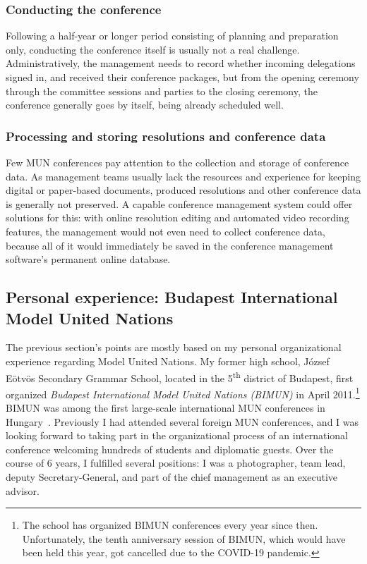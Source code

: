 \subsubsection{Conducting the conference}

Following a half-year or longer period consisting of planning and preparation only, conducting the conference itself is usually not a real challenge. Administratively, the management needs to record whether incoming delegations signed in, and received their conference packages, but from the opening ceremony through the committee sessions and parties to the closing ceremony, the conference generally goes by itself, being already scheduled well.

\subsubsection{Processing and storing resolutions and conference data}

Few MUN conferences pay attention to the collection and storage of conference data. As management teams usually lack the resources and experience for keeping digital or paper-based documents, produced resolutions and other conference data is generally not preserved. A capable conference management system could offer solutions for this: with online resolution editing and automated video recording features, the management would not even need to collect conference data, because all of it would immediately be saved in the conference management software's permanent online database.

\subsection{Personal experience: Budapest International Model United Nations}
\label{section:personalexperience}

The previous section's points are mostly based on my personal organizational experience regarding Model United Nations. My former high school, József Eötvös Secondary Grammar School, located in the 5\textsuperscript{th} district of Budapest, first organized \emph{Budapest International Model United Nations (BIMUN)} in April 2011.\footnote{The school has organized BIMUN conferences every year since then. Unfortunately, the tenth anniversary session of BIMUN, which would have been held this year, got cancelled due to the COVID-19 pandemic.} BIMUN was among the first large-scale international MUN conferences in Hungary~\cite{bimunhistory}. Previously I had attended several foreign MUN conferences, and I was looking forward to taking part in the organizational process of an international conference welcoming hundreds of students and diplomatic guests. Over the course of 6 years, I fulfilled several positions: I was a photographer, team lead, deputy Secretary-General, and part of the chief management as an executive advisor.

